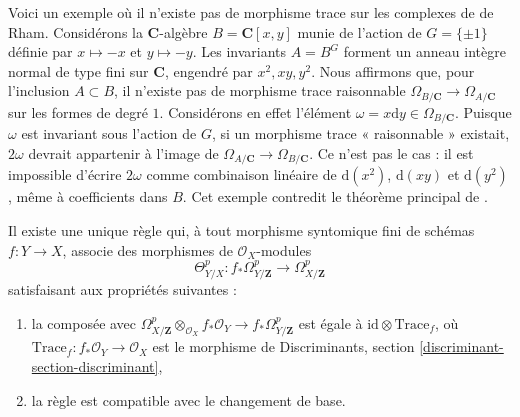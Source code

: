 \begin{example}
\label{example-no-trace}
Voici un exemple où il n'existe pas de morphisme trace sur les complexes de de Rham.
Considérons la $\mathbf{C}$-algèbre $B = \mathbf{C}[x, y]$ munie de
l'action de $G = \{\pm 1\}$ définie par $x \mapsto -x$ et $y \mapsto -y$.
Les invariants $A = B^G$ forment un anneau intègre normal de type fini sur $\mathbf{C}$,
engendré par $x^2, xy, y^2$. Nous affirmons que, pour l'inclusion $A \subset B$,
il n'existe pas de morphisme trace raisonnable
$\Omega_{B/\mathbf{C}} \to \Omega_{A/\mathbf{C}}$
sur les formes de degré $1$. Considérons en effet l'élément
$\omega = x \text{d} y \in \Omega_{B/\mathbf{C}}$.
Puisque $\omega$ est invariant sous l'action de $G$, si un morphisme trace « raisonnable »
existait, $2\omega$ devrait appartenir à l'image de
$\Omega_{A/\mathbf{C}} \to \Omega_{B/\mathbf{C}}$. Ce n'est
pas le cas : il est impossible d'écrire $2\omega$ comme combinaison linéaire
de $\text{d}(x^2)$, $\text{d}(xy)$ et $\text{d}(y^2)$,
même à coefficients dans $B$.
Cet exemple contredit le théorème principal de
\cite{Zannier}.
\end{example}

\begin{lemma}
\label{lemma-Garel}
Il existe une unique règle qui, à tout morphisme syntomique fini
de schémas $f : Y \to X$, associe des morphismes de $\mathcal{O}_X$-modules
$$
\Theta^p_{Y/X} :
f_*\Omega^p_{Y/\mathbf{Z}}
\longrightarrow
\Omega^p_{X/\mathbf{Z}}
$$
satisfaisant aux propriétés suivantes :
\begin{enumerate}
\item la composée avec
$\Omega^p_{X/\mathbf{Z}} \otimes_{\mathcal{O}_X} f_*\mathcal{O}_Y
\to f_*\Omega^p_{Y/\mathbf{Z}}$ est égale à
$\text{id} \otimes \text{Trace}_f$,
où $\text{Trace}_f : f_*\mathcal{O}_Y \to \mathcal{O}_X$
est le morphisme de
Discriminants, section \ref{discriminant-section-discriminant},
\item la règle est compatible avec le changement de base.
\end{enumerate}
\end{lemma}

